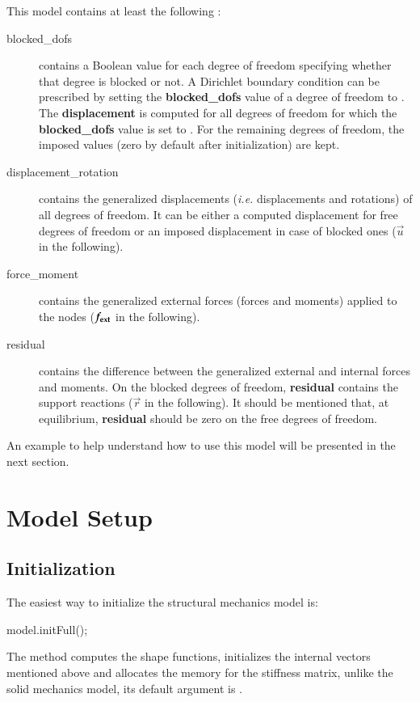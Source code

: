 \vspace{1cm}
This model contains at least the following :
\begin{description}
\item[blocked\_dofs] contains a Boolean value for each degree of
  freedom specifying whether that degree is blocked or not. A
  Dirichlet boundary condition can be prescribed by setting the
  \textbf{blocked\_dofs} value of a degree of freedom to
  . The \textbf{displacement} is computed for all degrees
  of freedom for which the \textbf{blocked\_dofs} value is set to
  . For the remaining degrees of freedom, the imposed
  values (zero by default after initialization) are kept.



\item[displacement\_rotation] contains the generalized displacements
  (\textit{i.e.} displacements and rotations) of all degrees of freedom. It can be
  either a computed displacement for free degrees of freedom or an
  imposed displacement in case of blocked ones ($\vec{u}$ in the
  following).

\item[force\_moment] contains the generalized external forces (forces
  and moments) applied to the nodes ($\boldsymbol{f_{{\mathrm{ext}}}}$ in the
  following).

\item[residual] contains the difference between the generalized external and internal
  forces and moments. On the blocked degrees of freedom,
  \textbf{residual} contains the support reactions ($\vec{r}$ in the
  following).  It should be mentioned that, at equilibrium,
  \textbf{residual} should be zero on the free degrees of freedom.
\end{description}

An example to help understand how  to use this model will be presented in the
next section.

\section{Model Setup}
\label{sec:structMechMod:setup}

\subsection{Initialization}
The easiest way to initialize the structural mechanics model is:

\begin{cpp}
  model.initFull();
\end{cpp}
The method  computes the shape functions, initializes
the internal vectors mentioned above and allocates the memory for the
stiffness matrix, unlike the solid mechanics model, its default argument is .

